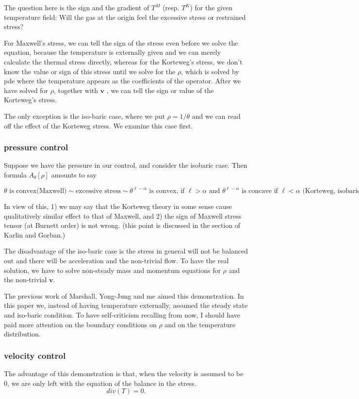 \documentclass[a4paper,12pt]{article}
\begin{document}
The question here is the sign and the gradient of {{{$T^M$ (resp. $T^K$)}}} for the given temperature field: Will the gas at the origin feel the excessive stress or restrained stress?

For Maxwell's stress, we can tell the sign of the stress even before we solve the equation, because the temperature is externally given and we can merely calculate the thermal stress directly, whereas for the Korteweg's stress, we don't know the value or sign of this stress until we solve for the $\rho$, which is solved by pde where the temperature appears as the coefficients of the operator. After we have solved for $\rho$, together with $\mathbf{v}$ , we can tell the sign or value of the Korteweg's stress.

The only exception is the iso-baric case, where we put $\rho = 1/\theta$ and we can read off the effect of the Korteweg stress. We examine this case first.

\subsubsection{pressure control}
Suppose we have the pressure in our control, and consider the isobaric case. Then formula {{{$A_\theta[\rho]$}}} amounts to say

{{{ $$ \text{$\theta$ is convex(Maxwell)} \sim \text{excessive stress} \sim  \text{$\theta^{\ell-\alpha}$ is convex, if $\ell>\alpha$ and $\theta^{\ell-\alpha}$ is concave if $\ell<\alpha$  (Korteweg, isobaric)} $$}}}

In view of this, 1) we may say that the Korteweg theory in some sense cause qualitatively similar effect to that of Maxwell, and 2) the sign of Maxwell stress tensor (at Burnett order) is not wrong. (this point is discussed in the section of Karlin and Gorban.)

The disadvantage of the iso-baric case is the stress in general will not be balanced out and there will be acceleration and the non-trivial flow. To have the real solution, we have to solve non-steady mass and momentum equations for $\rho$ and the non-trivial $\mathbf{v}$.

The previous work of Marshall, Yong-Jung and me aimed this demonstration. In this paper we, instead of having temperature externally, assumed the steady state and iso-baric condition. To have self-criticism recalling from now, I should have paid more attention on the boundary conditions on $\rho$ and on the temperature distribution.

\subsubsection{velocity control}
The advantage of this demonstration is that, when the velocity is assumed to be 0, we are only left with the equation of the balance in the stress. $$ div(T) = 0. $$
\end{document}
